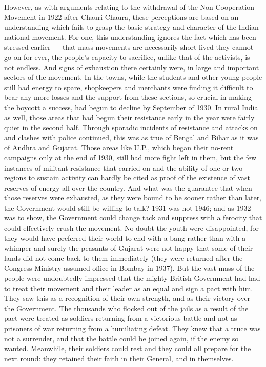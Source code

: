 \begin{multicols}{2}
However, as with arguments relating to the withdrawal of the Non Cooperation Movement in 1922 after Chauri Chaura, these perceptions are based on an understanding which fails to grasp the basic strategy and character of the Indian national movement. For one, this understanding ignores the fact which has been stressed earlier --- that mass movements are necessarily short-lived they cannot go on for ever, the people's capacity to sacrifice, unlike that of the activists, is not endless. And signs of exhaustion there certainly were, in large and important sectors of the movement. In the towns, while the students and other young people still had energy to spare, shopkeepers and merchants were finding it difficult to bear any more losses and the support from these sections, so crucial in making the boycott a success, had begun to decline by September of 1930. In rural India as well, those areas that had begun their resistance early in the year were fairly quiet in the second half. Through sporadic incidents of resistance and attacks on and clashes with police continued, this was as true of Bengal and Bihar as it was of Andhra and Gujarat. Those areas like U.P., which began their no-rent campaigns only at the end of 1930, still had more fight left in them, but the few instances of militant resistance that carried on and the ability of one or two regions to sustain activity can hardly be cited as proof of the existence of vast reserves of energy all over the country. And what was the guarantee that when those reserves were exhausted, as they were bound to be sooner rather than later, the Government would still be willing to talk? 1931 was not 1946; and as 1932 was to show, the Government could change tack and suppress with a ferocity that could effectively crush the movement. No doubt the youth were disappointed, for they would have preferred their world to end with a bang rather than with a whimper and surely the peasants of Gujarat were not happy that some of their lands did not come back to them immediately (they were returned after the Congress Ministry assumed office in Bombay in 1937). But the vast mass of the people were undoubtedly impressed that the mighty British Government had had to treat their movement and their leader as an equal and sign a pact with him. They saw this as a recognition of their own strength, and as their victory over the Government. The thousands who flocked out of the jails as a result of the pact were treated as soldiers returning from a victorious battle and not as prisoners of war returning from a humiliating defeat. They knew that a truce was not a surrender, and that the battle could be joined again, if the enemy so wanted. Meanwhile, their soldiers could rest and they could all prepare for the next round: they retained their faith in their General, and in themselves.


\end{multicols}
